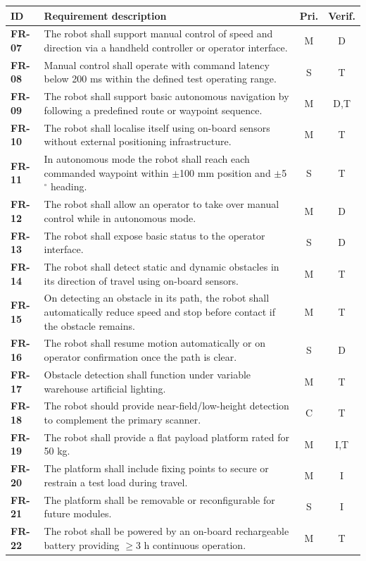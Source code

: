 \begin{longtable}{>{\bfseries}L{0.12\textwidth}L{0.65\textwidth}cc}
\toprule
ID & Requirement description & Pri. & Verif. \\
\midrule
\endhead
FR-07 & The robot shall support manual control of speed and direction via a handheld controller or operator interface. & M & D \\
FR-08 & Manual control shall operate with command latency below 200 ms within the defined test operating range. & S & T \\
FR-09 & The robot shall support basic autonomous navigation by following a predefined route or waypoint sequence. & M & D,T \\
FR-10 & The robot shall localise itself using on-board sensors without external positioning infrastructure. & M & T \\
FR-11 & In autonomous mode the robot shall reach each commanded waypoint within $\pm$100 mm position and $\pm$5$^\circ$ heading. & S & T \\
FR-12 & The robot shall allow an operator to take over manual control while in autonomous mode. & M & D \\
FR-13 & The robot shall expose basic status to the operator interface. & S & D \\
FR-14 & The robot shall detect static and dynamic obstacles in its direction of travel using on-board sensors. & M & T \\
FR-15 & On detecting an obstacle in its path, the robot shall automatically reduce speed and stop before contact if the obstacle remains. & M & T \\
FR-16 & The robot shall resume motion automatically or on operator confirmation once the path is clear. & S & D \\
FR-17 & Obstacle detection shall function under variable warehouse artificial lighting. & M & T \\
FR-18 & The robot should provide near-field/low-height detection to complement the primary scanner. & C & T \\
FR-19 & The robot shall provide a flat payload platform rated for 50 kg. & M & I,T \\
FR-20 & The platform shall include fixing points to secure or restrain a test load during travel. & M & I \\
FR-21 & The platform shall be removable or reconfigurable for future modules. & S & I \\
FR-22 & The robot shall be powered by an on-board rechargeable battery providing $\geq$3 h continuous operation. & M & T \\

\end{longtable}
